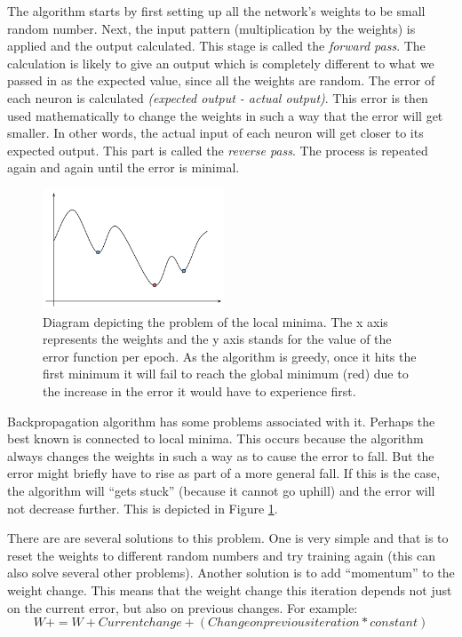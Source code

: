 The algorithm starts by first setting up all the network's weights to be small random number. Next, the input pattern (multiplication by the weights) is applied and the output calculated. This stage is called the \textit{forward pass}. The calculation is likely to give an output which is completely different to what we passed in as the expected value, since all the weights are random. The error of each neuron is calculated \textit{(expected output - actual output)}. This error is then used mathematically to change the weights in such a way that the error will get smaller. In other words, the actual input of each neuron will get closer to its expected output. This  part is called the \textit{reverse pass}. The process is repeated again and again until the error is minimal.

\begin{figure}
  \vspace{-30pt}
  \begin{center}
    \includegraphics[width=0.48\textwidth]{Figures/localminima}
  \end{center}
  \caption{Diagram depicting the problem of the local minima. The x axis represents the weights and the y axis stands for the value of the error function per epoch. As the algorithm is greedy, once it hits the first minimum it will fail to reach the global minimum (red) due to the increase in the error it would have to experience first.}
  \label{fig:localminima}
\end{figure}

Backpropagation algorithm has some problems associated with it. Perhaps the best known is connected to local minima. This occurs because the algorithm always changes the weights in such a way as to cause the error to fall. But the error might briefly have to rise as part of a more general fall. If this is the case, the algorithm will ``gets stuck'' (because it cannot go uphill) and the error will not decrease further. This is depicted in Figure \ref{fig:localminima}.

There are are several solutions to this problem. One is very simple and that is to reset the weights to different random numbers and try training again (this can also solve several other problems). Another solution is to add ``momentum'' to the weight change. This means that the weight change this iteration depends not just on the current error, but also on previous changes. For example: 
\begin{equation}
W+ = W + Current change + (Change on previous iteration * constant)
\end{equation}

